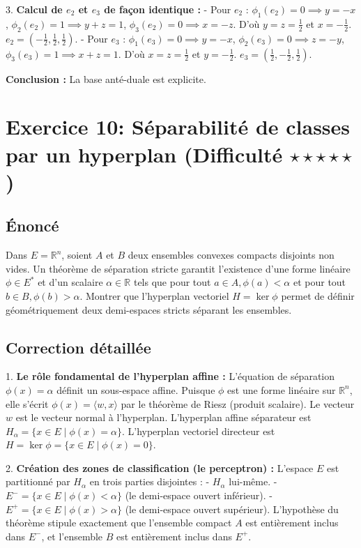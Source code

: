 \documentclass[11pt,a4paper]{report}
\begin{document}
3. \textbf{Calcul de $e_2$ et $e_3$ de façon identique :}
   - Pour $e_2$ : $\phi_1(e_2) = 0 \implies y = -x$, $\phi_2(e_2) = 1 \implies y + z = 1$, $\phi_3(e_2) = 0 \implies x = -z$.
     D'où $y = z = \frac{1}{2}$ et $x = -\frac{1}{2}$. $e_2 = (-\frac{1}{2}, \frac{1}{2}, \frac{1}{2})$.
   - Pour $e_3$ : $\phi_1(e_3) = 0 \implies y = -x$, $\phi_2(e_3) = 0 \implies z = -y$, $\phi_3(e_3) = 1 \implies x + z = 1$.
     D'où $x = z = \frac{1}{2}$ et $y = -\frac{1}{2}$. $e_3 = (\frac{1}{2}, -\frac{1}{2}, \frac{1}{2})$.

\textbf{Conclusion :}
La base anté-duale est explicite.

\section{Exercice 10: Séparabilité de classes par un hyperplan (Difficulté $\star \star \star \star \star$)}

\subsection{Énoncé}
Dans $E = \mathbb{R}^n$, soient $A$ et $B$ deux ensembles convexes compacts disjoints non vides. Un théorème de séparation stricte garantit l'existence d'une forme linéaire $\phi \in E^*$ et d'un scalaire $\alpha \in \mathbb{R}$ tels que pour tout $a \in A, \phi(a) < \alpha$ et pour tout $b \in B, \phi(b) > \alpha$.
Montrer que l'hyperplan vectoriel $H = \ker \phi$ permet de définir géométriquement deux demi-espaces stricts séparant les ensembles.

\subsection{Correction détaillée}

1. \textbf{Le rôle fondamental de l'hyperplan affine :}
   L'équation de séparation $\phi(x) = \alpha$ définit un sous-espace affine.
   Puisque $\phi$ est une forme linéaire sur $\mathbb{R}^n$, elle s'écrit $\phi(x) = \langle w, x \rangle$ par le théorème de Riesz (produit scalaire). Le vecteur $w$ est le vecteur normal à l'hyperplan.
   L'hyperplan affine séparateur est $H_\alpha = \{ x \in E \mid \phi(x) = \alpha \}$.
   L'hyperplan vectoriel directeur est $H = \ker \phi = \{ x \in E \mid \phi(x) = 0 \}$.

2. \textbf{Création des zones de classification (le perceptron) :}
   L'espace $E$ est partitionné par $H_\alpha$ en trois parties disjointes :
   - $H_\alpha$ lui-même.
   - $E^- = \{ x \in E \mid \phi(x) < \alpha \}$ (le demi-espace ouvert inférieur).
   - $E^+ = \{ x \in E \mid \phi(x) > \alpha \}$ (le demi-espace ouvert supérieur).
   L'hypothèse du théorème stipule exactement que l'ensemble compact $A$ est entièrement inclus dans $E^-$, et l'ensemble $B$ est entièrement inclus dans $E^+$.
\end{document}

